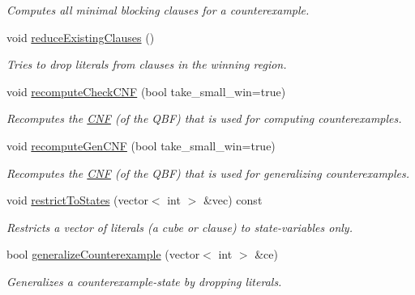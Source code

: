 \begin{DoxyCompactItemize}
\begin{DoxyCompactList}\small\item\em Computes all minimal blocking clauses for a counterexample. \end{DoxyCompactList}\item 
void \hyperlink{classLearnSynthQBFInc_a492a35b7aa57af25fe47b0693f4ec14c}{reduce\-Existing\-Clauses} ()
\begin{DoxyCompactList}\small\item\em Tries to drop literals from clauses in the winning region. \end{DoxyCompactList}\item 
void \hyperlink{classLearnSynthQBFInc_a9493b7c067234879ce68ba73cf510b59}{recompute\-Check\-C\-N\-F} (bool take\-\_\-small\-\_\-win=true)
\begin{DoxyCompactList}\small\item\em Recomputes the \hyperlink{classCNF}{C\-N\-F} (of the Q\-B\-F) that is used for computing counterexamples. \end{DoxyCompactList}\item 
void \hyperlink{classLearnSynthQBFInc_a98fa456db980f739d6825e1ee6c96cfa}{recompute\-Gen\-C\-N\-F} (bool take\-\_\-small\-\_\-win=true)
\begin{DoxyCompactList}\small\item\em Recomputes the \hyperlink{classCNF}{C\-N\-F} (of the Q\-B\-F) that is used for generalizing counterexamples. \end{DoxyCompactList}\item 
void \hyperlink{classLearnSynthQBFInc_acefbf03dca5bf13532c6fc3209a21e69}{restrict\-To\-States} (vector$<$ int $>$ \&vec) const 
\begin{DoxyCompactList}\small\item\em Restricts a vector of literals (a cube or clause) to state-\/variables only. \end{DoxyCompactList}\item 
bool \hyperlink{classLearnSynthQBFInc_a01b407cc989eae78f6f3e5c607a91dd5}{generalize\-Counterexample} (vector$<$ int $>$ \&ce)
\begin{DoxyCompactList}\small\item\em Generalizes a counterexample-\/state by dropping literals. \end{DoxyCompactList}\end{DoxyCompactItemize}
